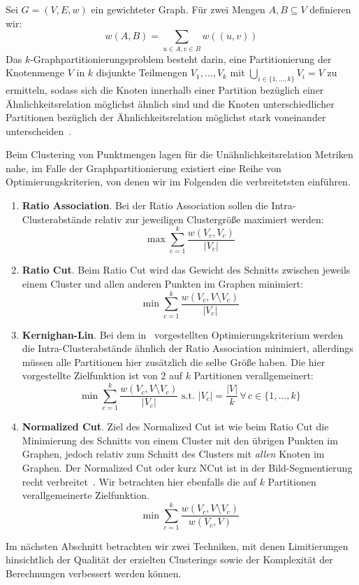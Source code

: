 \begin{definition}[$k$-Graphpartitionierung]
	Sei $G=(V,E,w)$ ein gewichteter Graph. Für zwei Mengen $A, B \subseteq V$ definieren wir:
	\[ w(A,B) = \sum_{u \in A, v \in B} w((u,v)) \]
	Das $k$-Graphpartitionierungsproblem besteht darin, eine Partitionierung der Knotenmenge $V$ in $k$ disjunkte Teilmengen
	$V_1, \dots, V_k$ mit $\bigcup_{i \in \{1, \dots, k \}} V_i = V$ zu ermitteln, sodass sich die Knoten innerhalb einer
	Partition bezüglich einer Ähnlichkeitsrelation möglichst ähnlich sind und die Knoten unterschiedlicher Partitionen
	bezüglich der Ähnlichkeitsrelation möglichst stark voneinander unterscheiden~\cite{KernighanL70}.
	
	Beim Clustering von Punktmengen lagen für die Unähnlichkeitsrelation Metriken nahe, im Falle der Graphpartitionierung
	existiert eine Reihe von Optimierungskriterien, von denen wir im Folgenden die verbreitetsten einführen.
	
	\begin{enumerate}
		\item 	\textbf{Ratio Association}. Bei der Ratio Association sollen die Intra-Clusterabstände relativ zur jeweiligen
				Clustergröße maximiert werden:
				\[ \max \sum_{c=1}^{k} \frac{w(V_c, V_c)}{\left|V_c\right|} \]
		\item 	\textbf{Ratio Cut}. Beim Ratio Cut wird das Gewicht des Schnitts zwischen jeweils einem Cluster und allen
				anderen Punkten im Graphen minimiert:
				\[ \min \sum_{c=1}^{k} \frac{w(V_c, V \setminus V_c)}{\left|V_c\right|} \]
		\item 	\textbf{Kernighan-Lin}. Bei dem in~\cite{KernighanL70} vorgestellten Optimierungskriterium werden die
				Intra-Clusterabstände ähnlich der Ratio Association minimiert, allerdings müssen alle Partitionen hier zusätzlich
				die selbe Größe haben. Die hier vorgestellte Zielfunktion ist von $2$ auf $k$ Partitionen verallgemeinert:
				\[ \min \sum_{c=1}^{k} \frac{w(V_c, V \setminus V_c)}{\left|V_c\right|} \textrm{ s.t. } 
				   \left|V_c\right| = \frac{\left|V\right|}{k} \, \forall \, c \in \{ 1, \dots, k \} \]
		\item 	\textbf{Normalized Cut}. Ziel des Normalized Cut ist wie beim Ratio Cut die Minimierung des Schnitts von einem
				Cluster mit den übrigen Punkten im Graphen, jedoch relativ zum Schnitt des Clusters mit \emph{allen}
				Knoten im Graphen. Der Normalized Cut oder kurz NCut ist in der Bild-Segmentierung recht verbreitet~\cite{ShiM00}.
				Wir betrachten hier ebenfalls die auf $k$ Partitionen verallgemeinerte Zielfunktion.
				\[ \min \sum_{c=1}^{k} \frac{w(V_c, V \setminus V_c)}{w(V_c, V)} \]
	\end{enumerate}
\end{definition}
Im nächsten Abschnitt betrachten wir zwei Techniken, mit denen Limitierungen hinsichtlich der Qualität der erzielten Clusterings
sowie der Komplexität der Berechnungen verbessert werden können.

